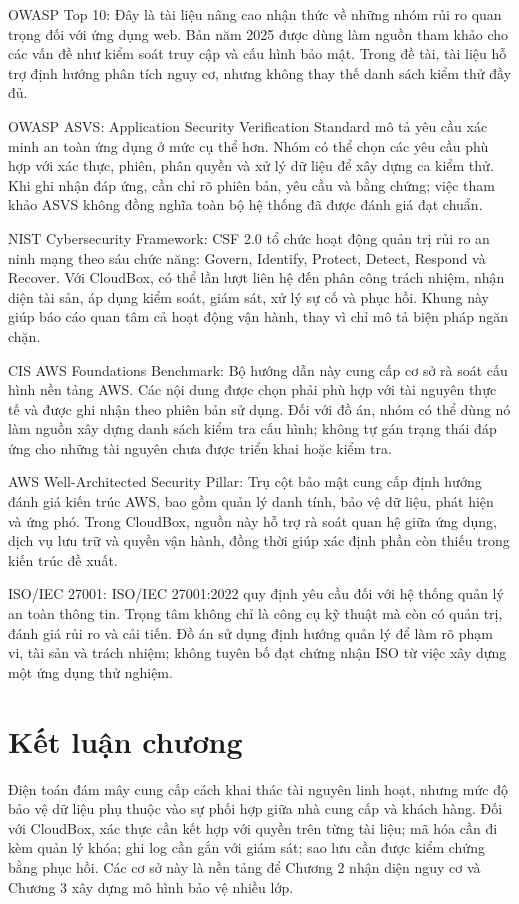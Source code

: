 OWASP Top 10: Đây là tài liệu nâng cao nhận thức về những nhóm rủi ro quan trọng đối với ứng dụng web. Bản năm 2025 được dùng làm nguồn tham khảo cho các vấn đề như kiểm soát truy cập và cấu hình bảo mật. Trong đề tài, tài liệu hỗ trợ định hướng phân tích nguy cơ, nhưng không thay thế danh sách kiểm thử đầy đủ.\cite{top10}

OWASP ASVS: Application Security Verification Standard mô tả yêu cầu xác minh an toàn ứng dụng ở mức cụ thể hơn. Nhóm có thể chọn các yêu cầu phù hợp với xác thực, phiên, phân quyền và xử lý dữ liệu để xây dựng ca kiểm thử. Khi ghi nhận đáp ứng, cần chỉ rõ phiên bản, yêu cầu và bằng chứng; việc tham khảo ASVS không đồng nghĩa toàn bộ hệ thống đã được đánh giá đạt chuẩn.\cite{asvs}

NIST Cybersecurity Framework: CSF 2.0 tổ chức hoạt động quản trị rủi ro an ninh mạng theo sáu chức năng: Govern, Identify, Protect, Detect, Respond và Recover. Với CloudBox, có thể lần lượt liên hệ đến phân công trách nhiệm, nhận diện tài sản, áp dụng kiểm soát, giám sát, xử lý sự cố và phục hồi. Khung này giúp báo cáo quan tâm cả hoạt động vận hành, thay vì chỉ mô tả biện pháp ngăn chặn.\cite{csf}

CIS AWS Foundations Benchmark: Bộ hướng dẫn này cung cấp cơ sở rà soát cấu hình nền tảng AWS. Các nội dung được chọn phải phù hợp với tài nguyên thực tế và được ghi nhận theo phiên bản sử dụng. Đối với đồ án, nhóm có thể dùng nó làm nguồn xây dựng danh sách kiểm tra cấu hình; không tự gán trạng thái đáp ứng cho những tài nguyên chưa được triển khai hoặc kiểm tra.\cite{cis}

AWS Well-Architected Security Pillar: Trụ cột bảo mật cung cấp định hướng đánh giá kiến trúc AWS, bao gồm quản lý danh tính, bảo vệ dữ liệu, phát hiện và ứng phó. Trong CloudBox, nguồn này hỗ trợ rà soát quan hệ giữa ứng dụng, dịch vụ lưu trữ và quyền vận hành, đồng thời giúp xác định phần còn thiếu trong kiến trúc đề xuất.\cite{pillar}

ISO/IEC 27001: ISO/IEC 27001:2022 quy định yêu cầu đối với hệ thống quản lý an toàn thông tin. Trọng tâm không chỉ là công cụ kỹ thuật mà còn có quản trị, đánh giá rủi ro và cải tiến. Đồ án sử dụng định hướng quản lý để làm rõ phạm vi, tài sản và trách nhiệm; không tuyên bố đạt chứng nhận ISO từ việc xây dựng một ứng dụng thử nghiệm.\cite{iso}

\section{Kết luận chương}
Điện toán đám mây cung cấp cách khai thác tài nguyên linh hoạt, nhưng mức độ bảo vệ dữ liệu phụ thuộc vào sự phối hợp giữa nhà cung cấp và khách hàng. Đối với CloudBox, xác thực cần kết hợp với quyền trên từng tài liệu; mã hóa cần đi kèm quản lý khóa; ghi log cần gắn với giám sát; sao lưu cần được kiểm chứng bằng phục hồi. Các cơ sở này là nền tảng để Chương 2 nhận diện nguy cơ và Chương 3 xây dựng mô hình bảo vệ nhiều lớp.

